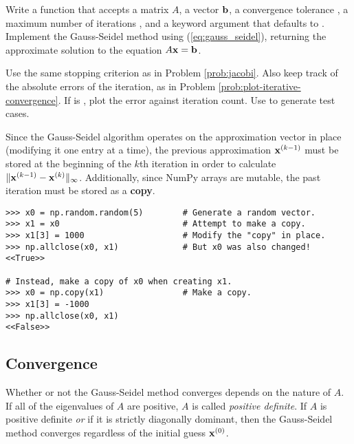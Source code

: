 \begin{problem} %
Write a function that accepts a matrix $A$, a vector $\mathbf{b}$, a convergence tolerance , a maximum number of iterations , and a keyword argument  that defaults to .
Implement the Gauss-Seidel method using (\ref{eq:gauss_seidel}), returning the approximate solution to the equation $A\mathbf{x} = \mathbf{b}$.

Use the same stopping criterion as in Problem \ref{prob:jacobi}.
Also keep track of the absolute errors of the iteration, as in Problem \ref{prob:plot-iterative-convergence}.
If  is , plot the error against iteration count.
Use  to generate test cases.

\begin{warn} %
Since the Gauss-Seidel algorithm operates on the approximation vector in place (modifying it one entry at a time), the previous approximation $\mathbf{x}^{(k-1)}$ must be stored at the beginning of the $k$th iteration in order to calculate $\|\mathbf{x}^{(k-1)} - \mathbf{x}^{(k)}\|_\infty$.
Additionally, since NumPy arrays are mutable, the past iteration must be stored as a \textbf{copy}.

\begin{lstlisting}
>>> x0 = np.random.random(5)        # Generate a random vector.
>>> x1 = x0                         # Attempt to make a copy.
>>> x1[3] = 1000                    # Modify the "copy" in place.
>>> np.allclose(x0, x1)             # But x0 was also changed!
<<True>>

# Instead, make a copy of x0 when creating x1.
>>> x0 = np.copy(x1)                # Make a copy.
>>> x1[3] = -1000
>>> np.allclose(x0, x1)
<<False>>
\end{lstlisting}
\end{warn}

\label{prob:gauss_seidel}
\end{problem}

\subsection*{Convergence} %

Whether or not the Gauss-Seidel method converges depends on the nature of $A$.
If all of the eigenvalues of $A$ are positive, $A$ is called \emph{positive definite}.
If $A$ is positive definite \emph{or} if it is strictly diagonally dominant, then the Gauss-Seidel method converges regardless of the initial guess $\mathbf{x}^{(0)}$.

